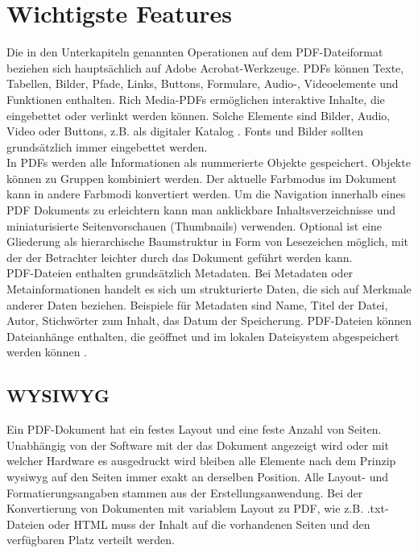 \section{Wichtigste Features}
Die in den Unterkapiteln genannten Operationen auf dem PDF-Dateiformat beziehen sich hauptsächlich auf Adobe Acrobat-Werkzeuge. PDFs können Texte, Tabellen, Bilder, Pfade, Links, Buttons, Formulare, Audio-, Videoelemente und Funktionen enthalten. Rich Media-PDFs ermöglichen interaktive Inhalte, die eingebettet oder verlinkt werden können. Solche Elemente sind Bilder, Audio, Video oder Buttons, z.B. als digitaler Katalog \cite{wiki-pdf-engl}. Fonts und Bilder sollten grundsätzlich immer eingebettet werden. \\
In PDFs werden alle Informationen als nummerierte Objekte gespeichert. Objekte können zu Gruppen kombiniert werden. Der aktuelle Farbmodus im Dokument kann in andere Farbmodi konvertiert werden. Um die Navigation innerhalb eines PDF Dokuments zu erleichtern kann man anklickbare Inhaltsverzeichnisse und miniaturisierte Seitenvorschauen (Thumbnails) verwenden. Optional ist eine Gliederung als hierarchische Baumstruktur in Form von Lesezeichen möglich, mit der der Betrachter leichter durch das Dokument geführt werden kann. \\
PDF-Dateien enthalten grundsätzlich Metadaten. Bei Metadaten oder Metainformationen handelt es sich um strukturierte Daten, die sich auf Merkmale anderer Daten beziehen. Beispiele für Metadaten sind Name, Titel der Datei, Autor, Stichwörter zum Inhalt, das Datum der Speicherung. PDF-Dateien können Dateianhänge enthalten, die geöffnet und im lokalen Dateisystem abgespeichert werden können \cite{wiki-pdf-engl}. 

\subsection{WYSIWYG}
Ein PDF-Dokument hat ein festes Layout und eine feste Anzahl von Seiten. Unabhängig von der Software mit der das Dokument angezeigt wird oder mit welcher Hardware es ausgedruckt wird bleiben alle Elemente nach dem Prinzip \gls{wysiwyg} auf den Seiten immer exakt an derselben Position. Alle Layout- und Formatierungsangaben stammen aus der Erstellungsanwendung. Bei der Konvertierung von Dokumenten mit variablem Layout zu PDF, wie z.B. .txt-Dateien oder HTML muss der Inhalt auf die vorhandenen Seiten und den verfügbaren Platz verteilt werden. 

